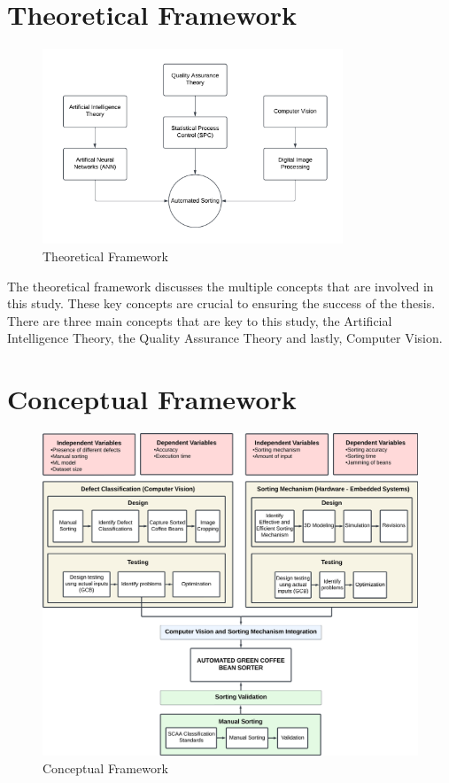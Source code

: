 

\section{Theoretical Framework}

\begin{figure}[!htbp]
	\centering
		\includegraphics[width=0.8\textwidth]{figure/theoretical_framework.png}
	\caption{Theoretical Framework}
	\label{fig:theoretical_framework}
\end{figure}

The theoretical framework discusses the multiple concepts that are involved in this study. These key concepts are crucial to ensuring the success of the thesis. There are three main concepts that are key to this study, the Artificial Intelligence Theory, the Quality Assurance Theory and lastly, Computer Vision.

\section{Conceptual Framework}

\begin{figure}[!htbp]
	\centering
		\includegraphics[width=\textwidth]{figure/conceptual_framework_v2.png}
	\caption{Conceptual Framework}
	\label{fig:conceptual_framework}
\end{figure}

